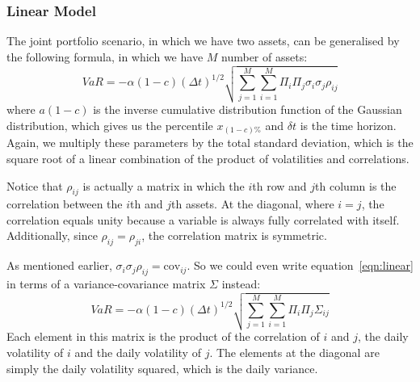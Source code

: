 \documentclass[../analytical_approach.tex]{subfiles}
\begin{document}
\subsubsection{Linear Model}

The joint portfolio scenario, in which we have two assets, can be generalised by the following formula, in which we have $M$ number of assets:
					\begin{equation}
						\label{eqn:linear}
						\mathit{VaR} = -\alpha(1-c)(\Delta t)^{1/2}\sqrt{\sum_{j=1}^M\sum_{i=1}^M\Pi_i\Pi_j\sigma_i\sigma_j\rho_{ij}} 
					\end{equation}
where $a(1-c)$ is the inverse cumulative distribution function of the Gaussian distribution, which gives us the percentile $x_{(1-c)\%}$ and $\delta t$ is the time horizon.
Again, we multiply these parameters by the total standard deviation, which is the square root of a linear combination of the product of volatilities and correlations.

Notice that $\rho_{ij}$ is actually a matrix in which the $i$th row and $j$th column is the correlation between the $i$th and $j$th assets.
At the diagonal, where $i = j$, the correlation equals unity because a variable is always fully correlated with itself.
Additionally, since $\rho_{ij} = \rho_{ji}$, the correlation matrix is symmetric.

As mentioned earlier, $\sigma_i\sigma_j\rho_{ij} = \text{cov}_{ij}$. So we could even write equation~\ref{eqn:linear} in terms of a variance-covariance matrix $\Sigma$ instead:
					\begin{equation}
						\label{eqn:linear2}
						\mathit{VaR} = -\alpha(1-c)(\Delta t)^{1/2}\sqrt{\sum_{j=1}^M\sum_{i=1}^M\Pi_i\Pi_j\Sigma_{ij}} 
					\end{equation}
Each element in this matrix is the product of the correlation of $i$ and $j$, the daily volatility of $i$ and the daily volatility of $j$. 
The elements at the diagonal are simply the daily volatility squared, which is the daily variance.
\end{document}
